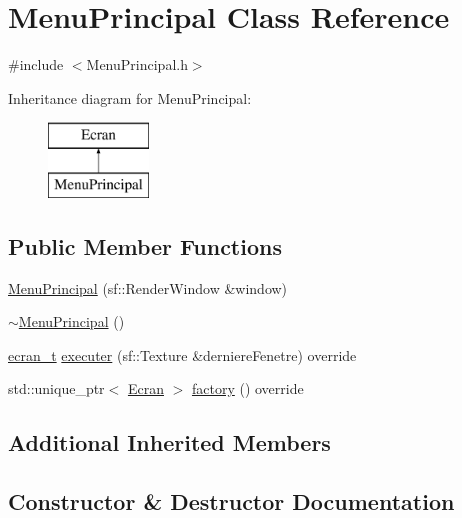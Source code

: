 \hypertarget{class_menu_principal}{}\section{Menu\+Principal Class Reference}
\label{class_menu_principal}


{\ttfamily \#include $<$Menu\+Principal.\+h$>$}

Inheritance diagram for Menu\+Principal\+:\begin{figure}[H]
\begin{center}
\leavevmode
\includegraphics[height=2.000000cm]{class_menu_principal}
\end{center}
\end{figure}
\subsection*{Public Member Functions}
\begin{DoxyCompactItemize}
\item 
\mbox{\hyperlink{class_menu_principal_a11b5448139a73a82361d19700398829e}{Menu\+Principal}} (sf\+::\+Render\+Window \&window)
\item 
\mbox{\hyperlink{class_menu_principal_a5f451a872334cfa96b59f47dbae52adc}{$\sim$\+Menu\+Principal}} ()
\item 
\mbox{\hyperlink{constantes_8h_a33e4f15dde10f34860a6b35be343ae56}{ecran\+\_\+t}} \mbox{\hyperlink{class_menu_principal_aed108ac830821b93ae4a03673ec566b9}{executer}} (sf\+::\+Texture \&derniere\+Fenetre) override
\item 
std\+::unique\+\_\+ptr$<$ \mbox{\hyperlink{class_ecran}{Ecran}} $>$ \mbox{\hyperlink{class_menu_principal_aa00616cf1c159b871ecbea2807be2687}{factory}} () override
\end{DoxyCompactItemize}
\subsection*{Additional Inherited Members}


\subsection{Constructor \& Destructor Documentation}
\mbox{\label{class_menu_principal_a11b5448139a73a82361d19700398829e}} 
